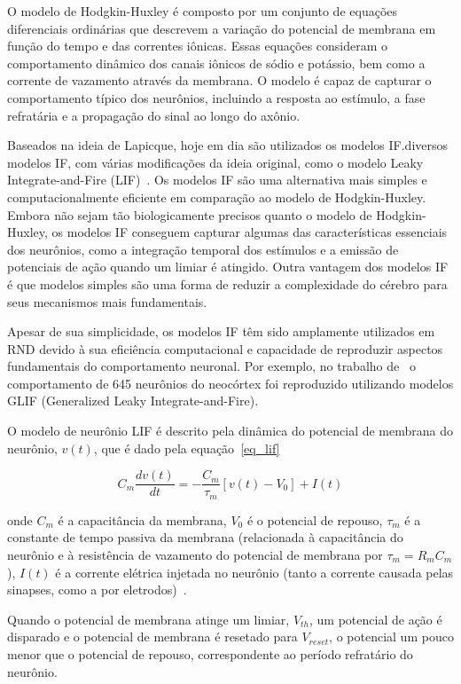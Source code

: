 O modelo de Hodgkin-Huxley é composto por um conjunto de equações diferenciais ordinárias que descrevem a variação do potencial de
membrana em função do tempo e das correntes iônicas. Essas equações consideram o comportamento dinâmico dos canais iônicos de
sódio e potássio, bem como a corrente de vazamento através da membrana. O modelo é capaz de capturar o comportamento típico dos
neurônios, incluindo a resposta ao estímulo, a fase refratária e a propagação do sinal ao longo do axônio.

Baseados na ideia de Lapicque, hoje em dia são utilizados os modelos IF.\@Existem diversos modelos IF, com
várias modificações da ideia original, como o modelo Leaky Integrate-and-Fire (LIF)~\cite{burkittReview2006}. Os modelos IF são
uma alternativa mais simples e computacionalmente eficiente em comparação ao modelo de Hodgkin-Huxley. Embora não sejam tão
biologicamente precisos quanto o modelo de Hodgkin-Huxley, os modelos IF conseguem capturar algumas das características essenciais
dos neurônios, como a integração temporal dos estímulos e a emissão de potenciais de ação quando um limiar é atingido. Outra
vantagem dos modelos IF é que modelos simples são uma forma de reduzir a complexidade do cérebro para seus mecanismos mais
fundamentais.

Apesar de sua simplicidade, os modelos IF têm sido amplamente utilizados em RND devido à sua eficiência computacional e capacidade
de reproduzir aspectos fundamentais do comportamento neuronal. Por exemplo, no trabalho de~\cite{teeterGeneralized2018} o
comportamento de 645 neurônios do neocórtex foi reproduzido utilizando modelos GLIF (Generalized Leaky Integrate-and-Fire). 

O modelo de neurônio LIF é descrito pela dinâmica do potencial de membrana do neurônio, $v(t)$, que é dado pela
equação~\ref{eq_lif}

\begin{equation}
\label{eq_lif}
C_m \frac{dv(t)}{dt} = -\frac{C_m}{\tau_m} [v(t) - V_0] + I(t)
\end{equation}

onde $C_m$ é a capacitância da membrana, $V_0$ é o potencial de repouso, $\tau_m$ é a constante de tempo passiva da membrana
(relacionada à capacitância do neurônio e à resistência de vazamento do potencial de membrana por $\tau_m = R_m C_m$), $I(t)$ é a
corrente elétrica injetada no neurônio (tanto a corrente causada pelas sinapses, como a por eletrodos)~\cite{burkittReview2006}. 

Quando o potencial de membrana atinge um limiar, $V_{th}$, um potencial de ação é disparado e o potencial de membrana é resetado
para $V_{reset}$, o potencial um pouco menor que o potencial de repouso, correspondente ao período refratário do neurônio.

